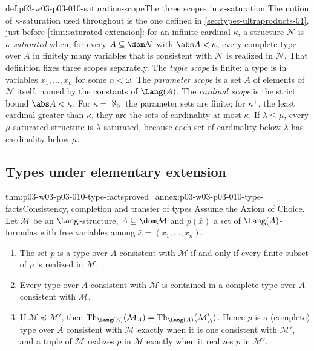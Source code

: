 \begin{hbconvention}{def:p03-w03-p03-010-saturation-scope}{The three scopes in \(\kappa\)-saturation}
The notion of \(\kappa\)-saturation used throughout is the one defined in
\cref{sec:types-ultraproducts-01}, just before \cref{thm:saturated-extension}:
for an infinite cardinal \(\kappa\), a structure \(\mathcal N\) is
\emph{\(\kappa\)-saturated} when, for every \(A\subseteq\dom\mathcal N\)
with \(\abs A<\kappa\), every complete type over \(A\) in finitely many
variables that is consistent with \(\mathcal N\) is realized in
\(\mathcal N\).  That definition fixes three scopes separately.  The \emph{tuple
scope} is finite: a type is in variables \(x_1,\ldots,x_n\) for some
\(n<\omega\).  The \emph{parameter scope} is a set \(A\) of elements of
\(\mathcal N\) itself, named by the constants of \(\Lang(A)\).  The
\emph{cardinal scope} is the strict bound \(\abs A<\kappa\).  For
\(\kappa=\aleph_0\) the parameter sets are finite; for \(\kappa^+\), the
least cardinal greater than \(\kappa\), they are the sets of cardinality at
most \(\kappa\).  If \(\lambda\leq\mu\), every \(\mu\)-saturated structure is
\(\lambda\)-saturated, because each set of cardinality below \(\lambda\) has
cardinality below \(\mu\).
\end{hbconvention}

\subsection{Types under elementary extension}
\label{sec:p03-w03-p03-010-type-facts}

\begin{hblemma}{thm:p03-w03-p03-010-type-facts}{proved=annex:p03-w03-p03-010-type-facts}{Consistency, completion and transfer of types}
Assume the Axiom of Choice.  Let \(\mathcal M\) be an \(\Lang\)-structure,
\(A\subseteq\dom\mathcal M\) and \(p(\bar x)\) a set of
\(\Lang(A)\)-formulas with free variables among
\(\bar x=(x_1,\ldots,x_n)\).
\begin{enumerate}
  \item The set \(p\) is a type over \(A\) consistent with \(\mathcal M\)
        if and only if every finite subset of \(p\) is realized in
        \(\mathcal M\).
  \item Every type over \(A\) consistent with \(\mathcal M\) is contained
        in a complete type over \(A\) consistent with \(\mathcal M\).
  \item If \(\mathcal M\preccurlyeq\mathcal M'\), then
        \(\operatorname{Th}_{\Lang(A)}(\mathcal M_A)=\operatorname{Th}_{\Lang(A)}(\mathcal M'_A)\).
        Hence \(p\) is a (complete) type over \(A\) consistent with
        \(\mathcal M\) exactly when it is one consistent with
        \(\mathcal M'\), and a tuple of \(\mathcal M\) realizes \(p\) in
        \(\mathcal M\) exactly when it realizes \(p\) in \(\mathcal M'\).
\end{enumerate}
\end{hblemma}

